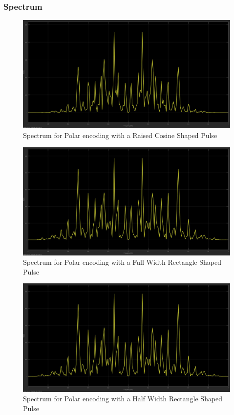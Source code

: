 \documentclass{article}
\begin{document}
\subsubsection{Spectrum}
\begin{figure}[H]
  \includegraphics[width = \linewidth]{Polar_Raised_Spectrum.jpg}
  \caption{Spectrum for Polar encoding with a Raised Cosine Shaped Pulse}
  \label{fig:Polar-Raised-Spectrum}
\end{figure}
\begin{figure}[H]
  \includegraphics[width = \linewidth]{Polar_Rect_F_Spectrum.jpg}
  \caption{Spectrum for Polar encoding with a Full Width Rectangle Shaped Pulse}
  \label{fig:Polar-Rect-F-Spectrum}
\end{figure}
\begin{figure}[H]
  \includegraphics[width = \linewidth]{Polar_Rect_H_Spectrum.jpg}
  \caption{Spectrum for Polar encoding with a Half Width Rectangle Shaped Pulse}
  \label{fig:Polar-Rect-H-Spectrum}
\end{figure}
\end{document}
